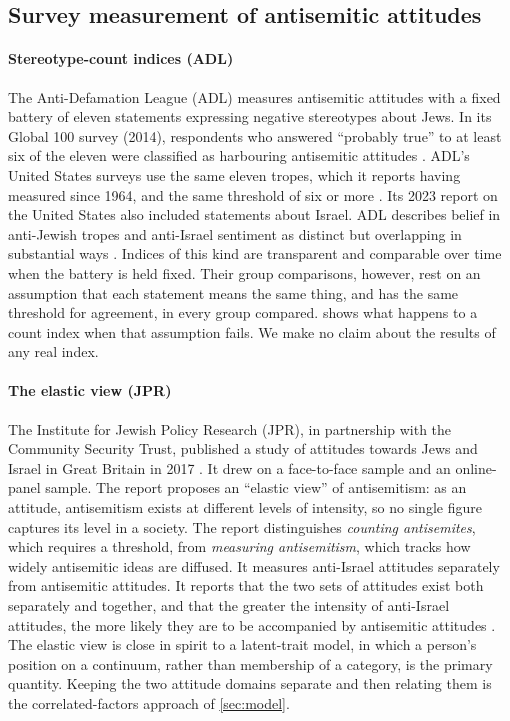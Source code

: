 \subsection{Survey measurement of antisemitic attitudes}\label{sec:bg-surveys}

\paragraph{Stereotype-count indices (ADL)}
The Anti-Defamation League (ADL) measures antisemitic attitudes with a fixed battery of eleven statements expressing negative stereotypes about Jews. In its Global 100 survey (2014), respondents who answered ``probably true'' to at least six of the eleven were classified as harbouring antisemitic attitudes \citep{adl2014global}. ADL's United States surveys use the same eleven tropes, which it reports having measured since 1964, and the same threshold of six or more \citep{adl2023attitudes}. Its 2023 report on the United States also included statements about Israel. ADL describes belief in anti-Jewish tropes and anti-Israel sentiment as distinct but overlapping in substantial ways \citep{adl2023attitudes}. Indices of this kind are transparent and comparable over time when the battery is held fixed. Their group comparisons, however, rest on an assumption that each statement means the same thing, and has the same threshold for agreement, in every group compared.  shows what happens to a count index when that assumption fails. We make no claim about the results of any real index.

\paragraph{The elastic view (JPR)}
The Institute for Jewish Policy Research (JPR), in partnership with the Community Security Trust, published a study of attitudes towards Jews and Israel in Great Britain in 2017 \citep{staetsky2017}. It drew on a face-to-face sample and an online-panel sample. The report proposes an ``elastic view'' of antisemitism: as an attitude, antisemitism exists at different levels of intensity, so no single figure captures its level in a society. The report distinguishes \emph{counting antisemites}, which requires a threshold, from \emph{measuring antisemitism}, which tracks how widely antisemitic ideas are diffused. It measures anti-Israel attitudes separately from antisemitic attitudes. It reports that the two sets of attitudes exist both separately and together, and that the greater the intensity of anti-Israel attitudes, the more likely they are to be accompanied by antisemitic attitudes \citep{staetsky2017}. The elastic view is close in spirit to a latent-trait model, in which a person's position on a continuum, rather than membership of a category, is the primary quantity. Keeping the two attitude domains separate and then relating them is the correlated-factors approach of \cref{sec:model}.

